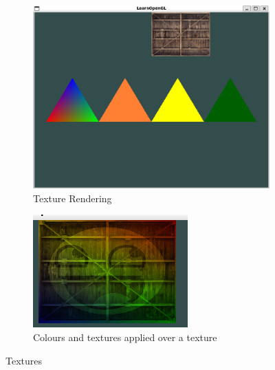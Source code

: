 \documentclass[a4paper, 12pt]{article}
\begin{document}
    \begin{figure}[H]
        \centering
        \begin{subfigure}[b]{0.45\textwidth}
            \centering
            \includegraphics[width=\textwidth]{openGL4TrianglesBox.png}
            \caption{Texture Rendering}
        \end{subfigure}
        \hfill
        \begin{subfigure}[b]{0.45\textwidth}
            \centering
            \includegraphics[width=\textwidth]{openGLLayeredTexturesAndColour.png}
            \caption{Colours and textures applied over a texture}
        \end{subfigure}
        \caption{Textures}
    \end{figure}
\end{document}
